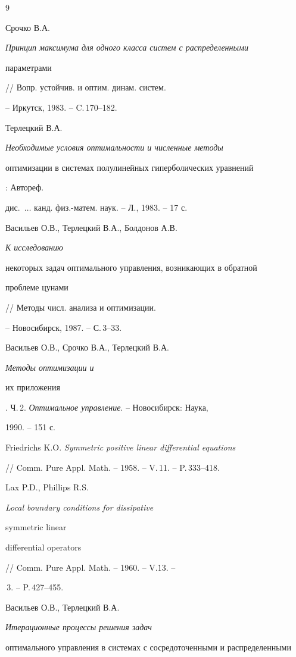 \begin{thebibliography}{9}







Срочко В.А. {\em Принцип максимума для одного класса систем с распределенными


параметрами} // Вопр. устойчив. и оптим. динам. систем.


-- Иркутск, 1983. -- C.\,170--182.




Терлецкий В.А. {\em Необходимые условия оптимальности и численные методы


оптимизации в системах полулинейных гиперболических уравнений}: Автореф.


дис.~$\dotsc$ канд. физ.-матем. наук. -- Л., 1983. -- 17 с.




Васильев О.В., Терлецкий В.А., Болдонов А.В. {\em К исследованию


некоторых задач оптимального управления, возникающих в обратной


проблеме цунами} // Методы числ. анализа и оптимизации.


-- Новосибирск, 1987. -- С.\,3--33.




Васильев О.В., Срочко В.А., Терлецкий В.А. {\em Методы оптимизации и


их приложения}. Ч.\,2. {\em Оптимальное управление}. -- Новосибирск: Наука,


1990. -- 151 с.




Friedrichs K.O. {\em Symmetric positive linear differential equations}


// Comm. Pure Appl. Math. -- 1958. -- V.\,11. -- P.\,333--418.




Lax P.D., Phillips R.S. {\em Local boundary conditions for dissipative


symmetric linear


differential operators} // Comm. Pure Appl. Math. -- 1960. -- V.\.13. --


\No\,3. -- P.\,427--455.




Васильев О.В., Терлецкий В.А. {\em Итерационные процессы решения задач


оптимального управления в системах с сосредоточенными и распределенными


}
\end{thebibliography}
